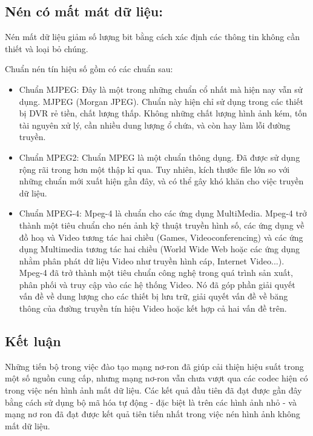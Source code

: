 \subsection{Nén có mất mát dữ liệu:}

Nén mất dữ liệu giảm số lượng bit bằng cách xác định các thông tin không cần thiết
và loại bỏ chúng.

Chuẩn nén tín hiệu số gồm có các chuẩn sau:

\begin{itemize}
      \item Chuẩn MJPEG:
            Đây là một trong những chuẩn cổ nhất mà hiện nay vẫn sử dụng. MJPEG (Morgan JPEG). Chuẩn này hiện chỉ sử dụng trong các thiết bị DVR rẻ tiền, chất lượng thấp. Không những chất lượng hình ảnh kém, tốn tài nguyên xử lý, cần nhiều dung lượng ổ chứa, và còn hay làm lỗi đường truyền.
      \item Chuẩn MPEG2:
            Chuẩn MPEG là một chuẩn thông dụng. Đã được sử dụng rộng rãi trong hơn một thập kỉ qua. Tuy nhiên, kích thước file lớn so với những chuẩn mới xuất hiện gần đây, và có thể gây khó khăn cho việc truyền dữ liệu.
      \item Chuẩn MPEG-4:
            Mpeg-4 là chuẩn cho các ứng dụng MultiMedia. Mpeg-4 trở thành một tiêu chuẩn cho nén ảnh kỹ thuật truyền hình số, các ứng dụng về đồ hoạ và Video tương tác hai chiều (Games, Videoconferencing) và các ứng dụng Multimedia tương tác hai chiều (World Wide Web hoặc các ứng dụng nhằm phân phát dữ liệu Video như truyền hình cáp, Internet Video...). Mpeg-4 đã trở thành một tiêu chuẩn công nghệ trong quá trình sản xuất, phân phối và truy cập vào các hệ thống Video. Nó đã góp phần giải quyết vấn đề về dung lượng cho các thiết bị lưu trữ, giải quyết vấn đề về băng thông của đường truyền tín hiệu Video hoặc kết hợp cả hai vấn đề trên.


\end{itemize}

\subsection{Kết luận}

Những tiến bộ trong việc đào tạo mạng nơ-ron đã giúp cải thiện hiệu suất
trong một số nguồn cung cấp, nhưng mạng nơ-ron vẫn chưa vượt qua các codec
hiện có trong việc nén hình ảnh mất dữ liệu. Các kết quả đầu tiên đã đạt
được gần đây bằng cách sử dụng bộ mã hóa tự động - đặc biệt là trên các hình ảnh nhỏ
- và mạng nơ ron đã đạt được kết quả tiên tiến nhất trong việc nén hình ảnh
không mất dữ liệu.

